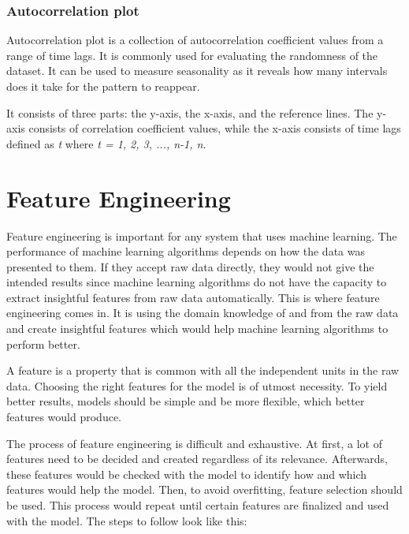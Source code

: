  \subsubsection{Autocorrelation plot}
Autocorrelation plot is a collection of autocorrelation coefficient values from a range of time lags. It is commonly used for evaluating the randomness of the dataset. It can be used to measure seasonality as it reveals how many intervals does it take for the pattern to reappear.

It consists of three parts: the y-axis, the x-axis, and the reference lines. The y-axis consists of correlation coefficient values, while the x-axis consists of time lags defined as \textit{t} where \textit{t = {1, 2, 3, ..., n-1, n}}.

\section{Feature Engineering}
Feature engineering is important for any system that uses machine learning. The performance of machine learning algorithms depends on how the data was presented to them. If they accept raw data directly, they would not give the intended results since machine learning algorithms do not have the capacity to extract insightful features from raw data automatically. This is where feature engineering comes in. It is using the domain knowledge of and from the raw data and create insightful features which would help machine learning algorithms to perform better. 

A feature is a property that is common with all the independent units in the raw data. Choosing the right features for the model is of utmost necessity. To yield better results, models should be simple and be more flexible, which better features would produce.

The process of feature engineering is difficult and exhaustive. At first, a lot of features need to be decided and created regardless of its relevance. Afterwards, these features would be checked with the model to identify how and which features would help the model. Then, to avoid overfitting, feature selection should be used. This process would repeat until certain features are finalized and used with the model. The steps to follow look like this:

